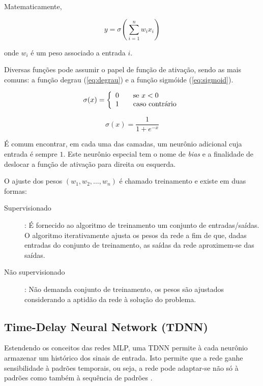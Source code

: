 Matematicamente,

\[ y = \sigma ( \sum_{i=1}^{n} w_i x_i ) \]

onde \(w_i\) é um peso associado a entrada \(i\).

Diversas funções pode assumir o papel de função de ativação, sendo as mais comuns:
a função degrau (\ref{eq:degrau}) e a função sigmóide (\ref{eq:sigmoid}).

\begin{equation} \label{eq:degrau}
    \sigma (x) = \left\{
    \begin{array}{l l}
        0 & \quad \text{se } x < 0\\
        1 & \quad \text{caso contrário}
    \end{array} \right.
\end{equation}

\begin{equation} \label{eq:sigmoid}
    \sigma (x) = \frac{1}{1 + e^{-x}}
\end{equation}

É comum encontrar, em cada uma das camadas, um neurônio adicional cuja entrada é sempre \(1\). Este neurônio especial tem o nome de \textit{bias} e a finalidade de deslocar a função de ativação para direita ou esquerda.

O ajuste dos pesos \((w_1, w_2, \dots , w_n)\) é chamado treinamento e existe em duas formas:

\begin{description}
    \item[Supervisionado]: É fornecido ao algoritmo de treinamento um conjunto de entradas/saídas. O algoritmo iterativamente ajusta os pesos da rede a fim de que, dadas entradas do conjunto de treinamento, as saídas da rede aproximem-se das saídas.
    \item[Não supervisionado]: Não demanda conjunto de treinamento, os pesos
são ajustados considerando a aptidão da rede à solução do problema.
\end{description}

\subsection{Time-Delay Neural Network (TDNN)}

Estendendo os conceitos das redes MLP, uma TDNN permite à cada neurônio armazenar um
histórico dos sinais de entrada. Isto permite que a rede ganhe sensibilidade à padrões temporais, ou seja, a rede pode adaptar-se não só à padrões como também à sequência de padrões \cite{kaiser94tdnn}.

